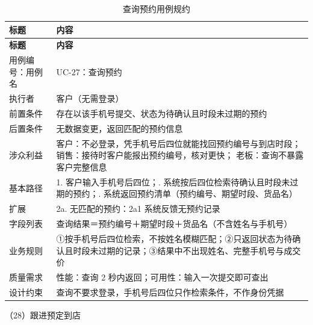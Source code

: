 {\small
\begin{longtable}{@{}L{3.0cm} L{12.3cm}@{}}
\caption{查询预约用例规约}\label{tab:uc-27}\\
\toprule
\textbf{标题} & \textbf{内容} \\
\midrule
\endfirsthead
\toprule
\textbf{标题} & \textbf{内容} \\
\midrule
\endhead
用例编号：用例名 & UC-27：查询预约 \\
\midrule
执行者 & 客户（无需登录） \\
\midrule
前置条件 & 存在以该手机号提交、状态为待确认且时段未过期的预约 \\
\midrule
后置条件 & 无数据变更，返回匹配的预约信息 \\
\midrule
涉众利益 & 客户：不必登录，凭手机号后四位就能找回预约编号与到店时段；\newline
销售：接待时客户能报出预约编号，核对更快；\newline
老板：查询不暴露客户完整信息 \\
\midrule
基本路径 & 1. 客户输入手机号后四位；. 系统按后四位检索待确认且时段未过期的预约；. 系统返回预约清单（预约编号、期望时段、货品名） \\
\midrule
扩展 & 2a. 无匹配的预约：2a1 系统反馈无预约记录 \\
\midrule
字段列表 & 查询结果＝预约编号＋期望时段＋货品名（不含姓名与手机号） \\
\midrule
业务规则 & ①按手机号后四位检索，不按姓名模糊匹配；\newline ②只返回状态为待确认且时段未过期的记录；\newline ③结果中不出现姓名、完整手机号与成交价 \\
\midrule
质量需求 & 性能：查询 2 秒内返回；可用性：输入一次提交即可查出 \\
\midrule
设计约束 & 查询不要求登录，手机号后四位只作检索条件，不作身份凭据 \\
\midrule
\bottomrule
\end{longtable}}

\noindent（28）跟进预定到店

